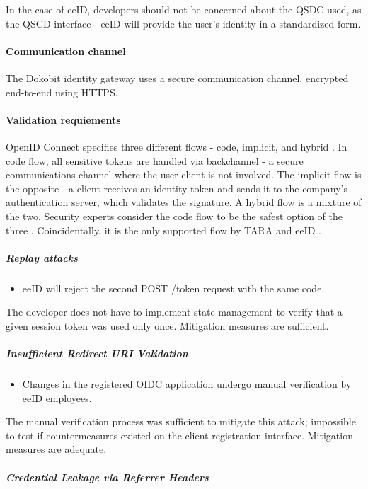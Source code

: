 In the case of eeID, developers should not be concerned about the QSDC used, as the QSCD interface - eeID will provide the user's identity in a standardized form.

\paragraph{Communication channel}

The Dokobit identity gateway uses a secure communication channel, encrypted end-to-end using HTTPS.

\paragraph{Validation requiements}

OpenID Connect specifies three different flows - code, implicit, and hybrid \cite{oidc}. In code flow, all sensitive tokens are handled via backchannel - a secure communications channel where the user client is not involved. The implicit flow is the opposite - a client receives an identity token and sends it to the company's authentication server, which validates the signature. A hybrid flow is a mixture of the two. Security experts consider the code flow to be the safest option of the three \cite{ietf-oauth-security-topics-19}. Coincidentally, it is the only supported flow by TARA and eeID \cite{tara-technical}.

\subparagraph{Replay attacks}

\begin{itemize}
  \item eeID will reject the second POST /token request with the same code.
\end{itemize}

The developer does not have to implement state management to verify that a given session token was used only once. Mitigation measures are sufficient.

\subparagraph{Insufficient Redirect URI Validation}

\begin{itemize}
  \item Changes in the registered OIDC application undergo manual verification by eeID employees.
\end{itemize}

The manual verification process was sufficient to mitigate this attack; impossible to test if countermeasures existed on the client registration interface. Mitigation measures are adequate.
\subparagraph{Credential Leakage via Referrer Headers}

